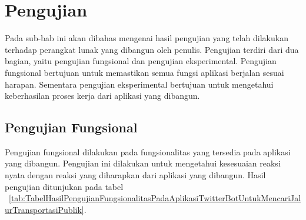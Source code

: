 \newpage
\section{Pengujian}
Pada sub-bab ini akan dibahas mengenai hasil pengujian yang telah dilakukan terhadap perangkat lunak yang dibangun oleh penulis. Pengujian terdiri dari dua bagian, yaitu pengujian fungsional dan pengujian eksperimental. Pengujian fungsional bertujuan untuk memastikan semua fungsi aplikasi berjalan sesuai harapan. Sementara pengujian eksperimental bertujuan untuk mengetahui keberhasilan proses kerja dari aplikasi yang dibangun.

\subsection{Pengujian Fungsional}
Pengujian fungsional dilakukan pada fungsionalitas yang tersedia pada aplikasi yang dibangun. Pengujian ini dilakukan untuk mengetahui kesesuaian reaksi nyata dengan reaksi yang diharapkan dari aplikasi yang dibangun. Hasil pengujian ditunjukan pada tabel ~\ref{tab:TabelHasilPengujianFungsionalitasPadaAplikasiTwitterBotUntukMencariJalurTransportasiPublik}.

